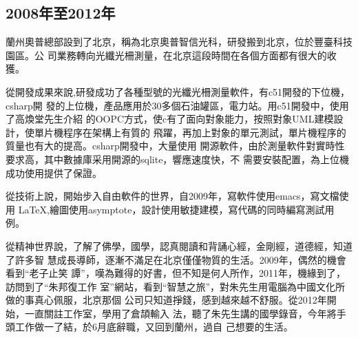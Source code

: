 \subsection{2008年至2012年}

蘭州奧普總部設到了北京，稱為北京奧普智信光科，研發搬到北京，位於豐臺科技園區。公
司業務轉向光纖光柵測量，在北京這段時間在各個方面都有很大的收獲。

從開發成果來說,研發成功了各種型號的光纖光柵測量軟件，有c51開發的下位機，csharp開
發的上位機，產品應用於30多個石油罐區，電力站。用c51開發中，使用了高煥堂先生介紹
的OOPC方式，使c有了面向對象能力，按照對象UML建模設計，使單片機程序在架構上有質的
飛躍，再加上對象的單元測試，單片機程序的質量也有大的提高。csharp開發中，大量使用
開源軟件，由於測量軟件對實時性要求高，其中數據庫采用開源的sqlite，響應速度快，不
需要安裝配置，為上位機成功使用提供了保證。

從技術上說，開始步入自由軟件的世界，自2009年，寫軟件使用emacs，寫文檔使用
\LaTeX{},繪圖使用asymptote，設計使用敏捷建模，寫代碼的同時編寫測試用例。

從精神世界說，了解了佛學，國學，認真閱讀和背誦心經，金剛經，道德經，知道了許多智
慧成長導師，逐漸不滿足在北京僅僅物質的生活。2009年，偶然的機會看到``老子止笑
譚''，嘆為難得的好書，但不知是何人所作，2011年，機緣到了，訪問到了``朱邦復工作
室''網站，看到``智慧之旅''，對朱先生用電腦為中國文化所做的事真心佩服，北京那個
公司只知道掙錢，感到越來越不舒服。從2012年開始，一直關註工作室，學用了倉頡輸入
法，聽了朱先生講的國學錄音，今年將手頭工作做一了結，於6月底辭職，又回到蘭州，過自
己想要的生活。

\newpage